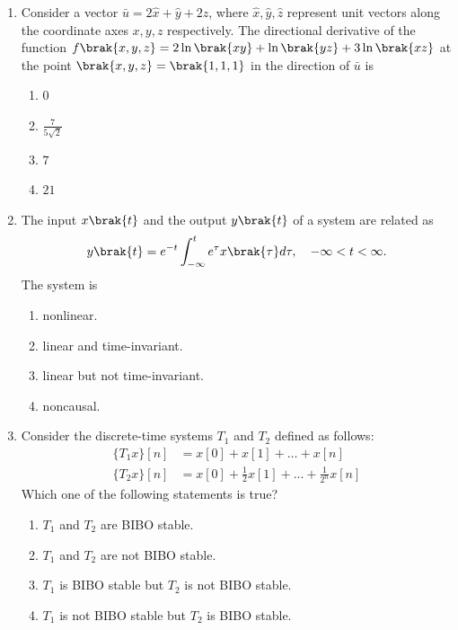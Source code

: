 \documentclass[journal,12pt,onecolumn]{IEEEtran}
\theoremstyle{remark}
\begin{document}
\begin{enumerate}[start=1, label=Q.\arabic*]
     \item Consider a vector $\bar{u} = 2\hat{x} + \hat{y} + 2\hat{z}$, where $\hat{x}, \hat{y}, \hat{z}$ represent unit vectors along the coordinate axes $x, y, z$ respectively. The directional derivative of the function $f\brak{x, y, z} = 2\ln\brak{xy} + \ln\brak{yz} + 3\ln\brak{xz}$ at the point $\brak{x, y, z} = \brak{1, 1, 1}$ in the direction of $\bar{u}$ is
    \begin{enumerate}
        \item $0$
        \item $\frac{7}{5\sqrt{2}}$
        \item $7$
        \item $21$
    \end{enumerate}


    \hfill{}

    \item The input $x\brak{t}$ and the output $y\brak{t}$ of a system are related as
    \begin{align*}
        y\brak{t} = e^{-t} \int_{-\infty}^{t} e^{\tau} x\brak{\tau} d\tau, \quad -\infty < t < \infty.
    \end{align*}
    The system is
    \begin{enumerate}
        \item nonlinear.
        \item linear and time-invariant.
        \item linear but not time-invariant.
        \item noncausal.
    \end{enumerate}
    \hfill{}

    \item Consider the discrete-time systems $T_1$ and $T_2$ defined as follows:
    \begin{align*}
        \{T_1x\}[n] &= x[0] + x[1] + \dots + x[n] \\
        \{T_2x\}[n] &= x[0] + \frac{1}{2}x[1] + \dots + \frac{1}{2^n}x[n]
    \end{align*}
    Which one of the following statements is true?
    \begin{enumerate}
        \item $T_1$ and $T_2$ are BIBO stable.
        \item $T_1$ and $T_2$ are not BIBO stable.
        \item $T_1$ is BIBO stable but $T_2$ is not BIBO stable.
        \item $T_1$ is not BIBO stable but $T_2$ is BIBO stable.
    \end{enumerate}


\end{enumerate}
\end{document}
